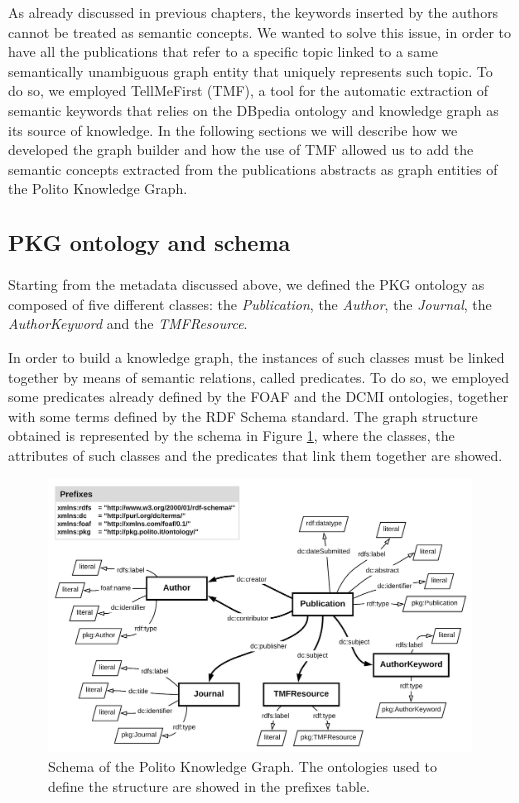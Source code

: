 \documentclass[%
    corpo=13.5pt,
    twoside,
    oldstyle,
    tipotesi=magistrale,
    greek,
    evenboxes
]{toptesi}
\begin{document}
As already discussed in previous chapters, the keywords inserted by the authors
cannot be treated as semantic concepts. We wanted to solve this issue, in order
to have all the publications that refer to a specific topic linked to a
same semantically unambiguous graph entity that uniquely represents such topic.
To do so, we employed TellMeFirst (TMF), a tool for the automatic extraction of
semantic keywords that relies on the DBpedia ontology and knowledge graph as
its source of knowledge.
In the following sections we will describe how we developed the graph builder
and how the use of TMF allowed us to add the semantic concepts extracted from
the publications abstracts as graph entities of the Polito Knowledge Graph.


\subsection{PKG ontology and schema}

Starting from the metadata discussed above, we defined
the PKG ontology as composed of five different classes:
the \emph{Publication}, the \emph{Author}, the \emph{Journal}, the
\emph{AuthorKeyword} and the \emph{TMFResource}.

In order to build a knowledge graph, the instances of such classes must be
linked together by means of semantic relations, called predicates.
To do so, we employed some predicates already defined by the
FOAF\cite{brickley2007} and the DCMI\cite{weibel1998} ontologies, together with
some terms defined by the RDF Schema standard.
The graph structure obtained is represented by the schema in
Figure \ref{fig:schema}, where the classes, the attributes of such classes and
the predicates that link them together are showed.

\begin{figure}[h]
    \centering
    \includegraphics[scale=0.20]{img/schema.png}
    \caption{Schema of the Polito Knowledge Graph. The ontologies used to
    define the structure are showed in the prefixes table.}
    \label{fig:schema}
\end{figure}
\end{document}
